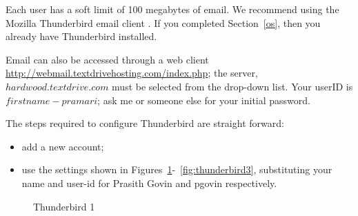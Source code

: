 \documentclass[11pt]{article}
\begin{document}
Each user has a soft limit of 100 megabytes of email.  We recommend using the Mozilla Thunderbird email client \cite{thunderbird}.  If you completed Section~\ref{os}, then you already have Thunderbird installed.

Email can also be accessed through a web client \url{http://webmail.textdrivehosting.com/index.php}; the server, $hardwood.textdrive.com$ must be selected from the drop-down list.  Your userID is	 $firstname-pramari$; ask me or someone else for your initial password.

The steps required to configure Thunderbird are straight forward: 
\begin{itemize}
\item add a new account;
\item use the settings shown in Figures~\ref{fig:thunderbird1}-~\ref{fig:thunderbird3}, substituting your name and user-id for Prasith Govin and pgovin respectively.
\end{itemize} 

\begin{figure}
\caption{\label{fig:thunderbird1} Thunderbird 1}
\end{figure}
\end{document}
